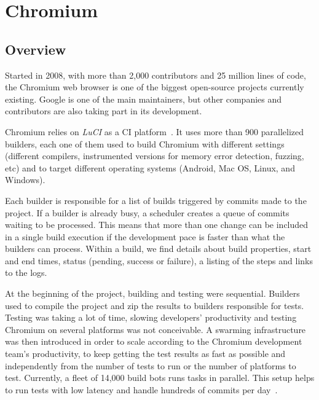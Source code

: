 \section{Chromium}
\label{sec:chromium-chromium}


\subsection{Overview}

Started in 2008, with more than 2,000 contributors and 25 million lines of code, the Chromium web browser is one of the biggest open-source projects currently existing. Google is one of the main maintainers, but other companies and contributors are also taking part in its development.

Chromium relies on \textit{LuCI} as a CI platform~\cite{onlineChromiumGithub}.
It uses more than 900 parallelized builders, each one of them used to build Chromium with different settings (\eg different compilers, instrumented versions for memory error detection, fuzzing, etc) and to target different operating systems (\eg Android, Mac OS, Linux, and Windows). 

Each builder is responsible for a list of builds triggered by commits made to the project. If a builder is already busy, a scheduler creates a queue of commits waiting to be processed. This means that more than one change can be included in a single build execution if the development pace is faster than what the builders can process. Within a build, we find details about build properties, start and end times, status (\ie pending, success or failure), a listing of the steps and links to the logs. 

At the beginning of the project, building and testing were sequential. Builders used to compile the project and zip the results to builders responsible for tests. Testing was taking a lot of time, slowing developers' productivity and testing Chromium on several platforms was not conceivable. A swarming infrastructure was then introduced in order to scale according to the Chromium development team's productivity, to keep getting the test results as fast as possible and independently from the number of tests to run or the number of platforms to test. Currently, a fleet of 14,000  build bots runs tasks in parallel. This setup helps to run tests with low latency and handle hundreds of commits per day~\cite{TheChromiumProjects}.

